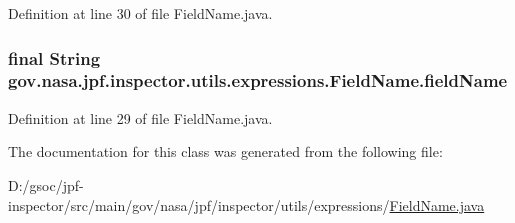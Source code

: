 Definition at line 30 of file Field\+Name.\+java.

\subsubsection[{\texorpdfstring{field\+Name}{fieldName}}]{\setlength{\rightskip}{0pt plus 5cm}final String gov.\+nasa.\+jpf.\+inspector.\+utils.\+expressions.\+Field\+Name.\+field\+Name\hspace{0.3cm}{\ttfamily [private]}}\hypertarget{classgov_1_1nasa_1_1jpf_1_1inspector_1_1utils_1_1expressions_1_1_field_name_ab14e6c0f870a6f8102c81e4508381398}{}\label{classgov_1_1nasa_1_1jpf_1_1inspector_1_1utils_1_1expressions_1_1_field_name_ab14e6c0f870a6f8102c81e4508381398}


Definition at line 29 of file Field\+Name.\+java.



The documentation for this class was generated from the following file\+:\begin{DoxyCompactItemize}
\item 
D\+:/gsoc/jpf-\/inspector/src/main/gov/nasa/jpf/inspector/utils/expressions/\hyperlink{_field_name_8java}{Field\+Name.\+java}\end{DoxyCompactItemize}
